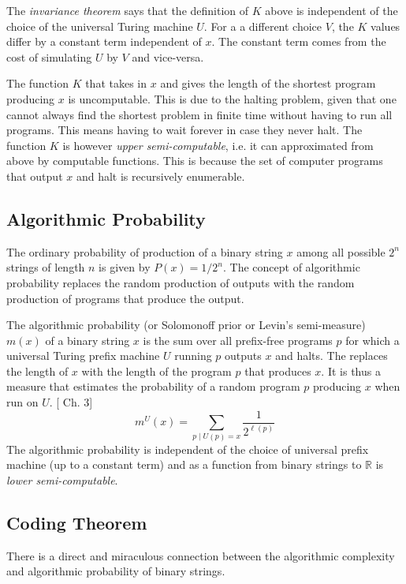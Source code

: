 \documentclass{article}
\newcommand{\m}{m^U}
\begin{document}
The \emph{invariance theorem} says that the definition of $K$ above is independent of the choice of the universal Turing machine $U$. For a a different choice $V$, the $K$ values differ by a constant term independent of $x$. The constant term comes from the cost of simulating $U$ by $V$ and vice-versa. 

The function $K$ that takes in $x$ and gives the length of the shortest program producing $x$ is uncomputable. This is due to the halting problem, given that one cannot always find  the shortest problem in finite time without having to run all programs. This means having to wait forever in case they never halt. The function $K$ is however \emph{upper semi-computable}, i.e. it can approximated from above by computable functions. This is because the set of computer programs that output $x$ and halt is recursively enumerable. 


\subsection{Algorithmic Probability} The ordinary probability of production of a binary string $x$  among all possible $2^n$ strings of length $n$ is given by $P(x) = 1/2^n$. The concept of algorithmic probability replaces the random production of outputs with the random production of programs that produce the output. 

The algorithmic probability (or Solomonoff prior or Levin's semi-measure) $m(x)$ of a binary string $x$ is the sum over all prefix-free programs $p$  for which a universal Turing prefix machine $U$ running $p$ outputs $x$ and halts. The replaces the length of $x$ with the length of the program $p$ that produces $x$. It is thus a measure that estimates the probability of a random program $p$  producing $x$ when run on $U$. [\cite{LiVitanyi2008} Ch. 3]
\begin{equation}
    \m(x) = \sum_{p \mid U(p) = x} \frac{1}{2^{\ell(p)}}
\end{equation}
The algorithmic probability is independent of the choice of universal prefix machine (up to a constant term) and as a function from binary strings to $\mathbb{R}$ is \emph{lower semi-computable}. 

\subsection{Coding Theorem}
There is a direct and miraculous connection between the algorithmic complexity and algorithmic probability of binary strings. 
\end{document}
